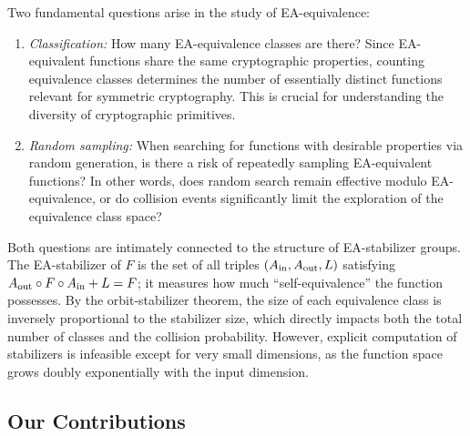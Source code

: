 \documentclass[11pt]{article}
\theoremstyle{definition}
\begin{document}
Two fundamental questions arise in the study of EA-equivalence:
\begin{enumerate}
\item \emph{Classification:} How many EA-equivalence classes are there? Since EA-equivalent
functions share the same cryptographic properties, counting equivalence classes determines the
number of essentially distinct functions relevant for symmetric cryptography. This is crucial
for understanding the diversity of cryptographic primitives.

\item \emph{Random sampling:} When searching for functions with desirable properties via random generation, is there
a risk of repeatedly sampling EA-equivalent functions? In other words, does random search remain
effective modulo EA-equivalence, or do collision events significantly limit the exploration of
the equivalence class space?
\end{enumerate}

Both questions are intimately connected to the structure of EA-stabilizer groups.
The EA-stabilizer of $F$ is the set of all triples $(A_{\rm in}, A_{\rm out}, L)$
satisfying $A_{\rm out}\circ F\circ A_{\rm in}+L = F$;
it measures how much ``self-equivalence'' the function possesses.
By the orbit-stabilizer theorem, the size of each equivalence class is inversely
proportional to the stabilizer size, which directly impacts both the total number of
classes and the collision probability. However, explicit computation of stabilizers is
infeasible except for very small dimensions, as the function space grows doubly
exponentially with the input dimension.

\subsection{Our Contributions}
\end{document}
